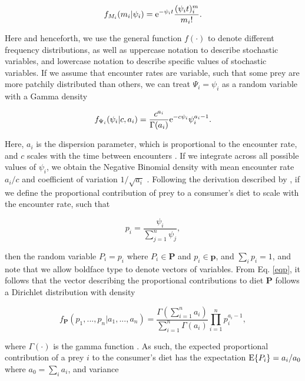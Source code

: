 \documentclass{frontiersSCNS}
\begin{document}
\begin{equation}
f_{M_i} (m_i|\psi_i) = {\rm e}^{-\psi_i t}\frac{(\psi_i t)^m_i}{m_i!}.
\end{equation}

\noindent Here and henceforth, we use the general function $f(\cdot)$ to denote different frequency distributions, as well as uppercase notation to describe stochastic variables, and lowercase notation to describe specific values of stochastic variables.
If we assume that encounter rates are variable, such that some prey are more patchily distributed than others, we can treat $\Psi_i = \psi_i$ as a random variable with a Gamma density

\begin{equation}
f_{\Psi_i} (\psi_i | c, a_i) = \frac{c^{a_i}}{\Gamma (a_i)}{\rm e}^{-c \psi_i}\psi_i^{a_i - 1}.
\end{equation}

\noindent Here, $a_i$ is the dispersion parameter, which is proportional to the encounter rate, and $c$ scales with the time between encounters \citep{Mangel:2006wa,Ainsworth:2010uo,Yeakel:2013hi}.
If we integrate across all possible values of $\psi_i$, we obtain the Negative Binomial density with mean encounter rate $a_i/c$ and coefficient of variation $1/\sqrt{a_i}$ \citep{Hilborn:1997ds}.
Following the derivation described by \citet{Ainsworth:2010uo}, if we define the proportional contribution of prey to a consumer's diet to scale with the encounter rate, such that

\begin{equation}
\label{eqp}
  p_i = \frac{\psi_i}{\sum_{j=1}^n \psi_j},
\end{equation}

\noindent then the random variable $P_i = p_i$ where $P_i \in {\bm P}$ and $p_i \in {\bm p}$, and $\sum_i p_i = 1$, and note that we allow boldface type to denote vectors of variables.
From Eq. \ref{eqp}, it follows that the vector describing the proportional contributions to diet $\bm P$ follows a Dirichlet distribution \citep{Johnson:1960gu} with density

\begin{equation}
  f_{\bm P}(p_1,...,p_n|a_1,...,a_n) = \frac{\Gamma(\sum_{i=1}^n a_i)}{\sum_{i=1}^n\Gamma(a_i)}\prod_{i=1}^n p_i^{a_i - 1},
\end{equation}

\noindent where $\Gamma(\cdot)$ is the gamma function \citep[cf.][]{Mangel:2006wa}.
As such, the expected proportional contribution of a prey $i$ to the consumer's diet has the expectation ${\rm E}\{P_i\}=a_i/a_0$ where $a_0 = \sum_i a_i$, and variance
\end{document}
